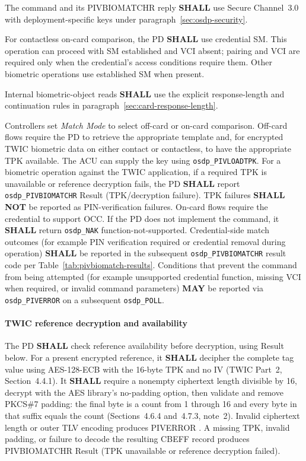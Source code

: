 The command and its PIVBIOMATCHR reply \textbf{SHALL} use Secure Channel~3.0
with deployment-specific keys under paragraph~\ref{sec:osdp-security}.



For contactless on-card comparison, the PD \textbf{SHALL} use credential SM.
This operation can proceed with SM established and VCI absent;
pairing and VCI are required only when the credential's access conditions
require them. Other biometric operations use established SM when present.

Internal biometric-object reads \textbf{SHALL} use the explicit response-length
and continuation rules in paragraph~\ref{sec:card-response-length}.

Controllers set \emph{Match Mode} to select off-card or on-card comparison. Off-card flows require the PD to retrieve the appropriate template and, for encrypted TWIC biometric data on either contact or contactless, to have the appropriate TPK available. The ACU can supply the key using \texttt{osdp\_PIVLOADTPK}. For a biometric operation against the TWIC application, if a required TPK is unavailable or reference decryption fails, the PD \textbf{SHALL} report \texttt{osdp\_PIVBIOMATCHR} Result  (TPK/decryption failure). TPK failures \textbf{SHALL NOT} be reported as PIN-verification failures. On-card flows require the credential to support OCC. If the PD does not implement the command, it \textbf{SHALL} return \texttt{osdp\_NAK} function-not-supported. Credential-side match outcomes (for example PIN verification required or credential removal during operation) \textbf{SHALL} be reported in the subsequent \texttt{osdp\_PIVBIOMATCHR} result code per Table~\ref{tab:pivbiomatch-results}. Conditions that prevent the command from being attempted (for example unsupported credential function, missing VCI when required, or invalid command parameters) \textbf{MAY} be reported via \texttt{osdp\_PIVERROR} on a subsequent \texttt{osdp\_POLL}.

\paragraph{TWIC reference decryption and availability}\label{sec:twic-reference}
The PD \textbf{SHALL} check reference availability before decryption, using
Result  below. For a present encrypted reference,
it \textbf{SHALL} decipher the complete tag  value using
AES-128-ECB with the 16-byte TPK and no IV (TWIC Part~2, Section~4.4.1).
It \textbf{SHALL} require a nonempty ciphertext length divisible by 16,
decrypt with the AES library's no-padding option, then validate and remove
PKCS\#7 padding: the final byte is a count from 1 through 16 and every byte
in that suffix equals the count (Sections~4.6.4 and~4.7.3, note~2).
Invalid ciphertext length or outer TLV encoding produces PIVERROR
. A missing TPK, invalid padding, or failure to decode the
resulting CBEFF record produces PIVBIOMATCHR Result 
(TPK unavailable or reference decryption failed).

